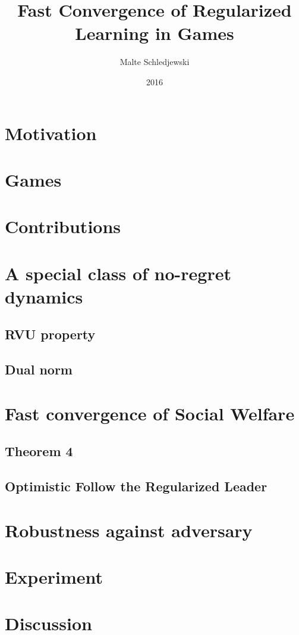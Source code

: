 \documentclass{beamer}
\title{Fast Convergence of Regularized Learning in Games}
\author{Malte Schledjewski}
\institute{Saarbrücken Graduate School of Computer Science}
\date{2016}
\begin{document}
\frame{\titlepage}

\section{Motivation}

\section{Games}


\section{Contributions}

\section{A special class of no-regret dynamics}
\subsection{RVU property}
\subsection{Dual norm}

\section{Fast convergence of Social Welfare}
  \subsection{Theorem 4} %
  \subsection{Optimistic Follow the Regularized Leader} %

\section{Robustness against adversary}

\section{Experiment}

\section{Discussion}
\end{document}
